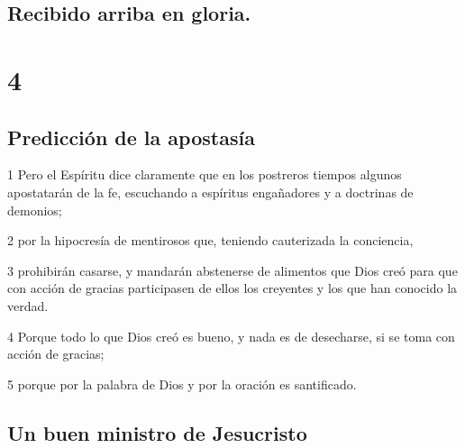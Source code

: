 \section*{Recibido arriba en gloria.}

\chapter{4}

\section*{Predicción de la apostasía}

\par 1 Pero el Espíritu dice claramente que en los postreros tiempos algunos apostatarán de la fe, escuchando a espíritus engañadores y a doctrinas de demonios;
\par 2 por la hipocresía de mentirosos que, teniendo cauterizada la conciencia,
\par 3 prohibirán casarse, y mandarán abstenerse de alimentos que Dios creó para que con acción de gracias participasen de ellos los creyentes y los que han conocido la verdad.
\par 4 Porque todo lo que Dios creó es bueno, y nada es de desecharse, si se toma con acción de gracias;
\par 5 porque por la palabra de Dios y por la oración es santificado.

\section*{Un buen ministro de Jesucristo}


